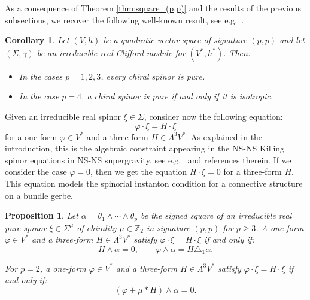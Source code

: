 \documentclass[10pt,reqno]{amsart}
\newtheorem{proposition}[theorem]{Proposition}
\newtheorem{corollary}[theorem]{Corollary}
\theoremstyle{definition}
\theoremstyle{remark}
\newcommand{\Z}{\mathbb{Z}}
\begin{document}
As a consequence of Theorem \ref{thm:square_(p,p)} and the results of the previous subsections, we recover the following well-known result, see e.g.\ \cite{Chevalley1954,Meinrenken2013}.

\begin{corollary}
    Let $(V,h)$ be a quadratic vector space of signature $(p,p)$ and let $(\Sigma,\gamma)$ be an irreducible real Clifford module for $(V^*,h^*)$. Then: \begin{itemize}
        \item In the cases $p=1,2,3$, every chiral spinor is pure.
        \item In the case $p=4$, a chiral spinor is pure if and only if it is isotropic.
    \end{itemize}
\end{corollary}

Given an irreducible real spinor $\xi\in\Sigma$, consider now the following equation: $$\varphi\cdot\xi=H\cdot\xi$$ for a one-form $\varphi\in V^*$ and a three-form $H\in\Lambda^3V^*$. As explained in the introduction, this is the algebraic constraint appearing in the NS-NS Killing spinor equations in NS-NS supergravity, see e.g.\ \cite{Friedrich_Ivanov2002,Agricola2006,ShahbaziThesis} and references therein. If we consider the case $\varphi=0$, then we get the equation $H\cdot\xi=0$ for a three-form $H$. This equation models the spinorial instanton condition for a connective structure on a bundle gerbe.

\begin{proposition}\label{prop:phi.xi=H.xi}
    Let $\alpha=\theta_1\wedge\cdots\wedge\theta_p$ be the signed square of an irreducible real pure spinor $\xi\in\Sigma^\mu$ of chirality $\mu\in\Z_2$ in signature $(p,p)$ for $p\geq3$. A one-form $\varphi\in V^*$ and a three-form $H\in\Lambda^3V^*$ satisfy $\varphi\cdot\xi=H\cdot\xi$ if and only if: $$H\wedge\alpha=0,\qquad \varphi\wedge\alpha=H\triangle_1\alpha.$$

    For $p=2$, a one-form $\varphi\in V^*$ and a three-form $H\in\Lambda^3V^*$ satisfy $\varphi\cdot\xi=H\cdot\xi$ if and only if: $$(\varphi+\mu*H)\wedge\alpha=0.$$
\end{proposition}
\end{document}
